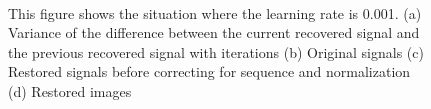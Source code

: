 \documentclass[UTF8,12pt]{article}
\begin{document}
	\begin{figure}[!ht]
		\centering
		\quad
		\\
		\quad
		\caption{\label{fig:sound3}This figure shows the situation where the learning rate is 0.001. (a) Variance of the difference between the current recovered signal and the previous recovered signal with iterations (b) Original signals (c) Restored signals before correcting for sequence and normalization (d) Restored images}
	\end{figure}
\end{document}
